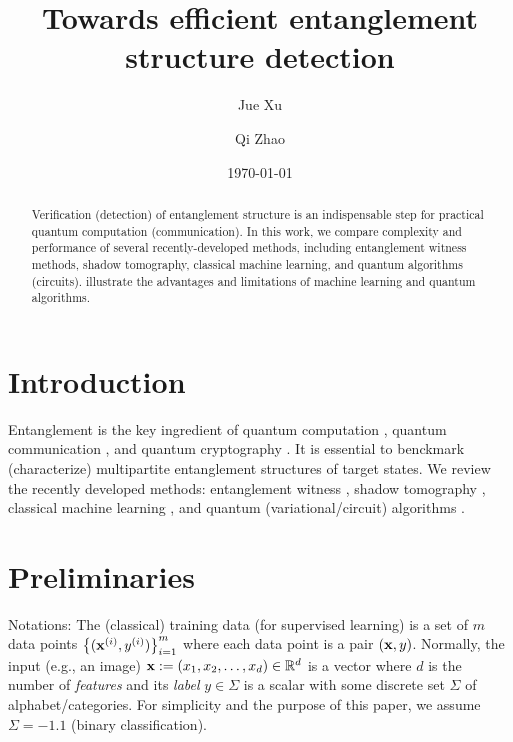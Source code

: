 \documentclass[
10pt,
aps,
pra,
linenumbers,
floatfix,
]{revtex4-2}
\theoremstyle{plain}
\theoremstyle{definition}
\begin{document}
\title{Towards efficient entanglement structure detection}
\author{Jue Xu}
\author{Qi Zhao}
\date{\today}
\begin{abstract}
	Verification (detection) of entanglement structure is an indispensable step for practical quantum computation (communication).
	In this work, we compare complexity and performance of several recently-developed methods, including entanglement witness methods, shadow tomography, classical machine learning, and quantum algorithms (circuits).
	illustrate the advantages and limitations of machine learning and quantum algorithms.
\end{abstract}

\maketitle
 \tableofcontents

\section{Introduction}
Entanglement \cite{horodeckiQuantumEntanglement2009} is the key ingredient of quantum computation \cite{}, quantum communication \cite{}, and quantum cryptography \cite{}.
It is essential to benckmark (characterize) multipartite entanglement structures of target states.
We review the recently developed methods: entanglement witness \cite{zhouDetectingMultipartiteEntanglement2019}, shadow tomography \cite{huangPredictingManyProperties2020}, classical machine learning \cite{huangPowerDataQuantum2021}, and quantum (variational/circuit) algorithms \cite{quekMultivariateTraceEstimation2022}.

\section{Preliminaries}
Notations:
The (classical) training data (for supervised learning) is a set of $m$ data points $\qty{(\vb{x}^{(i)}, y^{(i)})}^{m}_{i=1}$ 
where each data point is a pair $(\vb{x},y)$.
Normally, the input (e.g., an image) $\vb{x}:= (x_1,x_2,\dots,x_d) \in \mathbb{R}^d$  is a vector where $d$ is the number of \emph{features}
and its \emph{label} $y\in\Sigma$ is a scalar with some discrete set $\Sigma$ of alphabet/categories. 
For simplicity and the purpose of this paper, we assume $\Sigma=\qty{-1,1}$ (binary classification).
\end{document}
